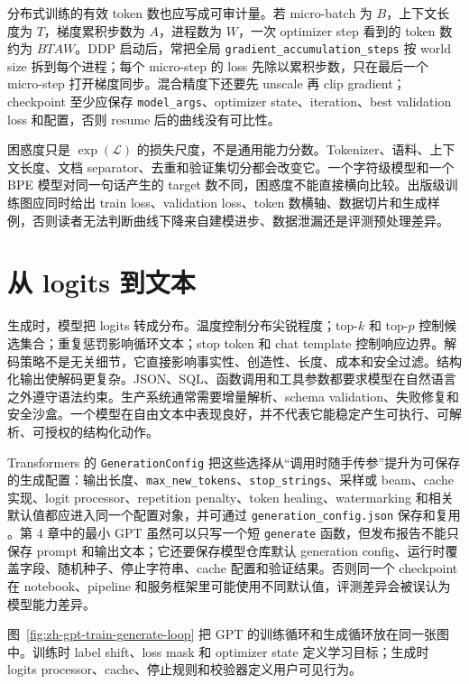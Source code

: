 \documentclass[UTF8,zihao=-4,openany]{ctexbook}
\begin{document}
分布式训练的有效 token 数也应写成可审计量。若 micro-batch 为 $B$，上下文长度为 $T$，梯度累积步数为 $A$，进程数为 $W$，一次 optimizer step 看到的 token 数约为 $BTAW$。DDP 启动后，常把全局 \texttt{gradient\_accumulation\_steps} 按 world size 拆到每个进程；每个 micro-step 的 loss 先除以累积步数，只在最后一个 micro-step 打开梯度同步。混合精度下还要先 unscale 再 clip gradient；checkpoint 至少应保存 \texttt{model\_args}、optimizer state、iteration、best validation loss 和配置，否则 resume 后的曲线没有可比性。

困惑度只是 $\exp(\mathcal{L})$ 的损失尺度，不是通用能力分数。Tokenizer、语料、上下文长度、文档 separator、去重和验证集切分都会改变它。一个字符级模型和一个 BPE 模型对同一句话产生的 target 数不同，困惑度不能直接横向比较。出版级训练图应同时给出 train loss、validation loss、token 数横轴、数据切片和生成样例，否则读者无法判断曲线下降来自建模进步、数据泄漏还是评测预处理差异。

\section{从 logits 到文本}
生成时，模型把 logits 转成分布。温度控制分布尖锐程度；top-$k$ 和 top-$p$ 控制候选集合；重复惩罚影响循环文本；stop token 和 chat template 控制响应边界。解码策略不是无关细节，它直接影响事实性、创造性、长度、成本和安全过滤。结构化输出使解码更复杂。JSON、SQL、函数调用和工具参数都要求模型在自然语言之外遵守语法约束。生产系统通常需要增量解析、schema validation、失败修复和安全沙盒。一个模型在自由文本中表现良好，并不代表它能稳定产生可执行、可解析、可授权的结构化动作。

Transformers 的 \texttt{GenerationConfig} 把这些选择从“调用时随手传参”提升为可保存的生成配置：输出长度、\texttt{max\_new\_tokens}、\texttt{stop\_strings}、采样或 beam、cache 实现、logit processor、repetition penalty、token healing、watermarking 和相关默认值都应进入同一个配置对象，并可通过 \texttt{generation\_config.json} 保存和复用 \cite{huggingface2026transformersgeneration}。第 4 章中的最小 GPT 虽然可以只写一个短 \texttt{generate} 函数，但发布报告不能只保存 prompt 和输出文本；它还要保存模型仓库默认 generation config、运行时覆盖字段、随机种子、停止字符串、cache 配置和验证结果。否则同一个 checkpoint 在 notebook、pipeline 和服务框架里可能使用不同默认值，评测差异会被误认为模型能力差异。

图~\ref{fig:zh-gpt-train-generate-loop} 把 GPT 的训练循环和生成循环放在同一张图中。训练时 label shift、loss mask 和 optimizer state 定义学习目标；生成时 logits processor、cache、停止规则和校验器定义用户可见行为。
\end{document}
